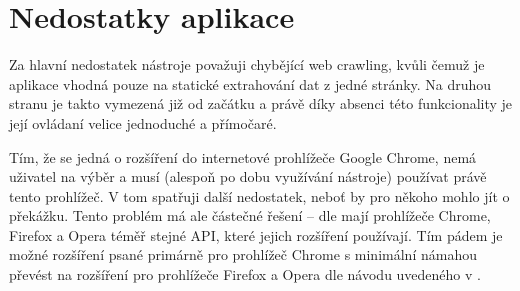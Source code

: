 \documentclass[thesis=B,czech]{FITthesis}[2012/06/26]
\begin{document}

\section{Nedostatky aplikace}
Za hlavní nedostatek nástroje považuji chybějící web crawling, kvůli čemuž je aplikace vhodná pouze na statické extrahování dat z jedné stránky. Na druhou stranu je takto vymezená již od začátku a právě díky absenci této funkcionality je její ovládaní velice jednoduché a přímočaré.

Tím, že se jedná o rozšíření do internetové prohlížeče Google Chrome, nemá uživatel na výběr a musí (alespoň po dobu využívání nástroje) používat právě tento prohlížeč. V tom spatřuji další nedostatek, neboť by pro někoho mohlo jít o překážku. Tento problém má ale částečné řešení -- dle \cite{extension_porting} mají prohlížeče Chrome, Firefox a Opera téměř stejné API, které jejich rozšíření používají. Tím pádem je možné rozšíření psané primárně pro prohlížeč Chrome s minimální námahou převést na rozšíření pro prohlížeče Firefox a Opera dle návodu uvedeného v \cite{extension_porting}.

\end{document}

